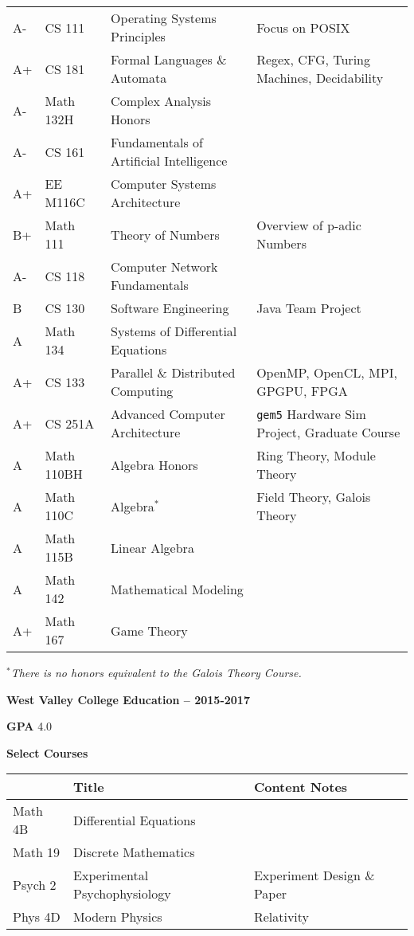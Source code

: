 \documentclass[11pt]{article}
\newcommand{\myTitle}[1]{{ \vspace{2mm} \large \color{titleColor} \hspace{-12mm} \textbf{\textsf{#1}} \vspace{2mm}}}
\newcommand{\myKey}[1]{{\color{keyColor}\textbf{#1}}}
\newcommand{\lighttt}[1]{{\color{lightttColor}\texttt{#1}}}
\begin{document}
{\begin{tabular}{l l l l}
\rowcolor{oddColor}
A- & CS 111 & Operating Systems Principles & Focus on POSIX \\
\rowcolor{oddColor}
A+ & CS 181 & Formal Languages \& Automata & Regex, CFG, Turing Machines, Decidability \\
\rowcolor{oddColor}
A- & Math 132H & Complex Analysis Honors & \\

\rowcolor{evenColor}
A- & CS 161 & Fundamentals of Artificial Intelligence & \\
\rowcolor{evenColor}
A+ & EE M116C & Computer Systems Architecture & \\
\rowcolor{evenColor}
B+ & Math 111 & Theory of Numbers & Overview of p-adic Numbers \\

\rowcolor{oddColor}
A- & CS 118 & Computer Network Fundamentals & \\
\rowcolor{oddColor}
B  & CS 130 & Software Engineering & Java Team Project \\
\rowcolor{oddColor}
A  & Math 134 & Systems of Differential Equations & \\

\rowcolor{evenColor}
A+ & CS 133 & Parallel \& Distributed Computing & OpenMP, OpenCL, MPI, GPGPU, FPGA \\
\rowcolor{evenColor}
A+ & CS 251A & Advanced Computer Architecture & \lighttt{gem5} Hardware Sim Project, Graduate Course \\
\rowcolor{evenColor}
A  & Math 110BH & Algebra Honors & Ring Theory, Module Theory \\

\rowcolor{oddColor}
A  & Math 110C & Algebra\( ^* \) & Field Theory, Galois Theory \\
\rowcolor{oddColor}
A  & Math 115B & Linear Algebra & \\

\rowcolor{evenColor}
A & Math 142 & Mathematical Modeling & \\
\rowcolor{evenColor}
A+ & Math 167 & Game Theory & \\
\hline
\end{tabular}
}

\textit{\( ^* \)There is no honors equivalent to the Galois Theory Course.}

\myTitle{West Valley College Education -- 2015-2017}

\myKey{GPA} 4.0

\myKey{Select Courses}

\begin{tabular}{l l l}
\hline
 & Title & Content Notes \\
\hline
\rowcolor{oddColor} Math 4B & Differential Equations & \\
\rowcolor{oddColor} Math 19 & Discrete Mathematics & \\
\rowcolor{oddColor}
Psych 2 & Experimental Psychophysiology & Experiment Design \& Paper \\
\rowcolor{oddColor} Phys 4D & Modern Physics & Relativity \\
\hline
\end{tabular}
\end{document}
